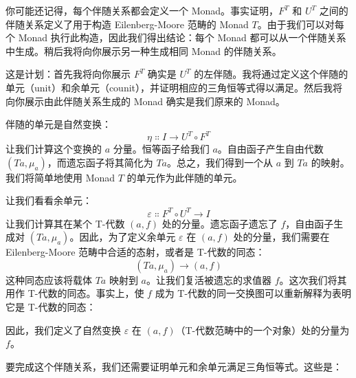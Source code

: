 你可能还记得，每个伴随关系都会定义一个 Monad。事实证明，$F^T$ 和 $U^T$ 之间的伴随关系定义了用于构造 Eilenberg-Moore 范畴的 Monad $T$。由于我们可以对每个 Monad 执行此构造，因此我们得出结论：每个 Monad 都可以从一个伴随关系中生成。稍后我将向你展示另一种生成相同 Monad 的伴随关系。

这是计划：首先我将向你展示 $F^T$ 确实是 $U^T$ 的左伴随。我将通过定义这个伴随的单元（unit）和余单元（counit），并证明相应的三角恒等式得以满足。然后我将向你展示由此伴随关系生成的 Monad 确实是我们原来的 Monad。

伴随的单元是自然变换：
\[\eta \Colon I \to U^T \circ F^T\]
让我们计算这个变换的 $a$ 分量。恒等函子给我们 $a$。自由函子产生自由代数 $(T a, \mu_a)$，而遗忘函子将其简化为 $T a$。总之，我们得到一个从 $a$ 到 $T a$ 的映射。我们将简单地使用 Monad $T$ 的单元作为此伴随的单元。

让我们看看余单元：
\[\varepsilon \Colon F^T \circ U^T \to I\]
让我们计算其在某个 T-代数 $(a, f)$ 处的分量。遗忘函子遗忘了 $f$，自由函子生成对 $(T a, \mu_a)$。因此，为了定义余单元 $\varepsilon$ 在 $(a, f)$ 处的分量，我们需要在 Eilenberg-Moore 范畴中合适的态射，或者是 T-代数的同态：
\[(T a, \mu_a) \to (a, f)\]
这种同态应该将载体 $T a$ 映射到 $a$。让我们复活被遗忘的求值器 $f$。这次我们将其用作 T-代数的同态。事实上，使 $f$ 成为 T-代数的同一交换图可以重新解释为表明它是 T-代数的同态：

\begin{figure}[H]
  \centering
\end{figure}

\noindent
因此，我们定义了自然变换 $\varepsilon$ 在 $(a, f)$（T-代数范畴中的一个对象）处的分量为 $f$。

要完成这个伴随关系，我们还需要证明单元和余单元满足三角恒等式。这些是：

\begin{figure}[H]
  \centering
  \begin{subfigure}
    \centering
  \end{subfigure}%
  \hspace{1cm}
  \begin{subfigure}
    \centering
  \end{subfigure}
\end{figure}

